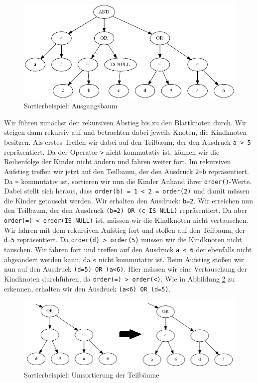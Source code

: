 \begin{figure}[H]
\includegraphics[scale=0.6]{Bilder/sort_1.png}
\caption{Sortierbeispiel: Ausgangsbaum}
\label{fig:sort_1}
\end{figure}

Wir führen zunächst den rekursiven Abstieg bis zu den Blattknoten durch. Wir steigen dann rekursiv auf und betrachten dabei jeweils Knoten, die Kindknoten besitzen. Als erstes Treffen wir dabei auf den Teilbaum, der den Ausdruck \verb|a > 5| repräsentiert. Da der Operator \verb|>| nicht kommutativ ist, können wir die Reihenfolge der Kinder nicht ändern und fahren weiter fort. Im rekursiven Aufstieg treffen wir jetzt auf den Teilbaum, der den Ausdruck \verb|2=b| repräsentiert. Da \verb|=| kommutativ ist, sortieren wir nun die Kinder Anhand ihrer \verb|order()|-Werte. Dabei stellt sich heraus, dass \verb|order(b) = 1 < 2 = order(2)| und damit müssen die Kinder getauscht werden. Wir erhalten den Ausdruck: \verb|b=2|. 
Wir erreichen nun den Teilbaum, der den Ausdruck \verb|(b=2) OR (c IS NULL)| repräsentiert. Da aber \verb|order(=) < order(IS NULL)| ist, müssen wir die Kindknoten nicht vertauschen.
Wir fahren mit dem rekursiven Aufstieg fort und stoßen auf den Teilbaum, der \verb|d=5| repräsentiert. Da \verb|order(d) > order(5)| müssen wir die Kindknoten nicht tauschen. Wir fahren fort und treffen auf den Ausdruck \verb|a < 6| der ebenfalls nicht abgeändert werden kann, da \verb|<| nicht kommutativ ist. 
Beim Aufstieg stoßen wir nun auf den Ausdruck \verb|(d=5) OR (a<6)|. Hier müssen wir eine Vertauschung der Kindknoten durchführen, da \verb|order(=) > order(<)|. Wie in Abbildung \ref{fig:sort_step1} zu erkennen, erhalten wir den Ausdruck \verb|(a<6) OR (d=5)|.

\begin{figure}[H]
\centering
\includegraphics[scale=0.5]{Bilder/sort_step1.png}
\caption{Sortierbeispiel: Umsortierung der Teilbäume}
\label{fig:sort_step1}
\end{figure}

